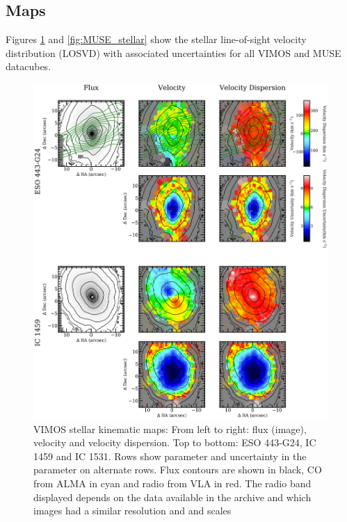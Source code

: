 	\subsection{Maps}
		\label{subsec:maps}
		Figures \ref{fig:VIMOS_stellar} and \ref{fig:MUSE_stellar} show the stellar line-of-sight velocity distribution (LOSVD) with associated uncertainties for all VIMOS and MUSE datacubes.

		\begin{figure}
			\centering
			\includegraphics[height=0.94\textheight]{chapter4/vimos/kin1.png}
			\caption[VIMOS stellar kinematic maps]{VIMOS stellar kinematic maps: From left to right: flux (image), velocity and velocity dispersion. Top to bottom: ESO 443-G24, IC 1459 and IC 1531. Rows show parameter and uncertainty in the parameter on alternate rows. Flux contours are shown in black, CO from ALMA in cyan and radio from VLA in red. The radio band displayed depends on the data available in the archive and which images had a similar resolution and and scales}
			\label{fig:VIMOS_stellar}
		\end{figure}
